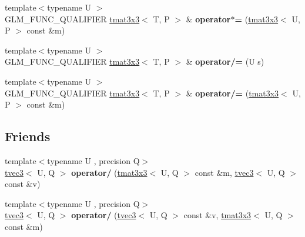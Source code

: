 \begin{DoxyCompactItemize}
\item 
{\footnotesize template$<$typename U $>$ }\\G\+L\+M\+\_\+\+F\+U\+N\+C\+\_\+\+Q\+U\+A\+L\+I\+F\+I\+ER \hyperlink{structglm_1_1detail_1_1tmat3x3}{tmat3x3}$<$ T, P $>$ \& {\bfseries operator$\ast$=} (\hyperlink{structglm_1_1detail_1_1tmat3x3}{tmat3x3}$<$ U, P $>$ const \&m)\hypertarget{structglm_1_1detail_1_1tmat3x3_af8ac2b47f30d93952aec87ca734934a5}{}\label{structglm_1_1detail_1_1tmat3x3_af8ac2b47f30d93952aec87ca734934a5}

\item 
{\footnotesize template$<$typename U $>$ }\\G\+L\+M\+\_\+\+F\+U\+N\+C\+\_\+\+Q\+U\+A\+L\+I\+F\+I\+ER \hyperlink{structglm_1_1detail_1_1tmat3x3}{tmat3x3}$<$ T, P $>$ \& {\bfseries operator/=} (U s)\hypertarget{structglm_1_1detail_1_1tmat3x3_a676cc80fc06dbc44a4eef890452cb12c}{}\label{structglm_1_1detail_1_1tmat3x3_a676cc80fc06dbc44a4eef890452cb12c}

\item 
{\footnotesize template$<$typename U $>$ }\\G\+L\+M\+\_\+\+F\+U\+N\+C\+\_\+\+Q\+U\+A\+L\+I\+F\+I\+ER \hyperlink{structglm_1_1detail_1_1tmat3x3}{tmat3x3}$<$ T, P $>$ \& {\bfseries operator/=} (\hyperlink{structglm_1_1detail_1_1tmat3x3}{tmat3x3}$<$ U, P $>$ const \&m)\hypertarget{structglm_1_1detail_1_1tmat3x3_a7664a2c6d0e4f299e0e53efcbb4dcabf}{}\label{structglm_1_1detail_1_1tmat3x3_a7664a2c6d0e4f299e0e53efcbb4dcabf}

\end{DoxyCompactItemize}
\subsection*{Friends}
\begin{DoxyCompactItemize}
\item 
{\footnotesize template$<$typename U , precision Q$>$ }\\\hyperlink{structglm_1_1detail_1_1tvec3}{tvec3}$<$ U, Q $>$ {\bfseries operator/} (\hyperlink{structglm_1_1detail_1_1tmat3x3}{tmat3x3}$<$ U, Q $>$ const \&m, \hyperlink{structglm_1_1detail_1_1tvec3}{tvec3}$<$ U, Q $>$ const \&v)\hypertarget{structglm_1_1detail_1_1tmat3x3_ac84f82f1605a6094a397c84daa80a201}{}\label{structglm_1_1detail_1_1tmat3x3_ac84f82f1605a6094a397c84daa80a201}

\item 
{\footnotesize template$<$typename U , precision Q$>$ }\\\hyperlink{structglm_1_1detail_1_1tvec3}{tvec3}$<$ U, Q $>$ {\bfseries operator/} (\hyperlink{structglm_1_1detail_1_1tvec3}{tvec3}$<$ U, Q $>$ const \&v, \hyperlink{structglm_1_1detail_1_1tmat3x3}{tmat3x3}$<$ U, Q $>$ const \&m)\hypertarget{structglm_1_1detail_1_1tmat3x3_a62cedcc444ac62727b8ae82f6b3249b8}{}\label{structglm_1_1detail_1_1tmat3x3_a62cedcc444ac62727b8ae82f6b3249b8}

\end{DoxyCompactItemize}


